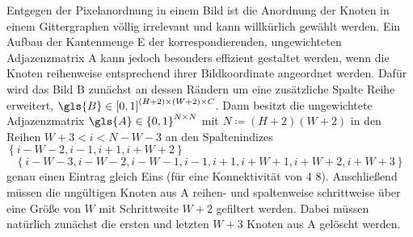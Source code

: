 Entgegen der Pixelanordnung in einem Bild ist die Anordnung der Knoten in einem Gittergraphen völlig irrelevant und kann willkürlich gewählt werden.
Ein Aufbau der Kantenmenge \gls{E} \bzw{} der korrespondierenden, ungewichteten Adjazenzmatrix \gls{A} kann jedoch besonders effizient gestaltet werden, wenn die Knoten reihenweise entsprechend ihrer Bildkoordinate angeordnet werden.
Dafür wird das Bild \gls{B} zunächst an dessen Rändern um eine zusätzliche Spalte \bzw{} Reihe erweitert, \dhe{} $\gls{B} \in {\left[0, 1\right]}^{\left(H + 2\right) \times \left(W + 2\right) \times C}$.
Dann besitzt die ungewichtete Adjazenzmatrix $\gls{A} \in {\left\{0, 1\right\}}^{N \times N}$ mit $N \coloneqq \left(H+2\right)\left(W+2\right)$ in den Reihen $W+3 < i < N - W - 3$ an den Spaltenindizes $\left\{i-W-2, i-1, i+1, i+W+2\right\}$ \bzw{}
\begin{equation*}
  \left\{i-W-3, i-W-2, i-W-1, i-1, i+1, i+W+1, i+W+2, i+W+3\right\}
\end{equation*}
genau einen Eintrag gleich Eins (für eine Konnektivität von $4$ \bzw{} $8$).
Anschließend müssen die ungültigen Knoten aus \gls{A} reihen- und spaltenweise schrittweise über eine Größe von $W$ mit Schrittweite $W+2$ gefiltert werden.
Dabei müssen natürlich zunächst die ersten und letzten $W + 3$ Knoten aus \gls{A} gelöscht werden.

